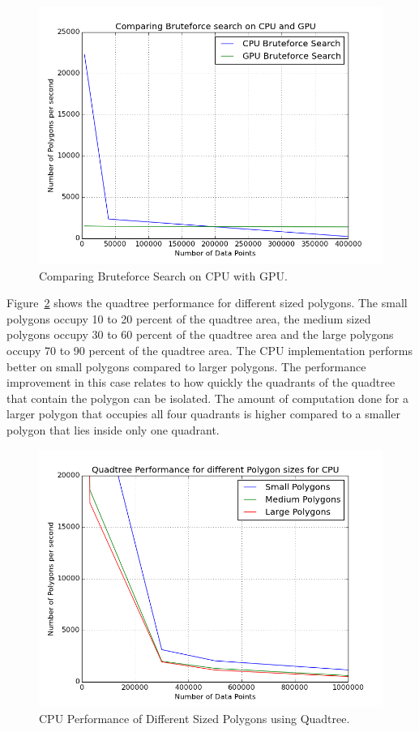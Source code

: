 \begin{figure}[H]
\centering
\vspace{0.5in}
    \includegraphics[scale=0.55]{Images/CPU_GPU_brute_new_2}
    \vspace{0.5in}
    \caption{Comparing Bruteforce Search on CPU with GPU.}
    \label{fig:comparing_bruteforce_gpu}
  \end{figure}

Figure~\ref{fig:cpu_quadtree_performance} shows the quadtree performance for different sized polygons. The small polygons occupy 10 to 20 percent of the quadtree area, the medium sized polygons occupy 30 to 60 percent of the quadtree area and the large polygons occupy 70 to 90 percent of the quadtree area.
The CPU implementation performs better on small polygons compared to larger polygons. The performance improvement in this case relates to how quickly the quadrants of the quadtree that contain the polygon can be isolated. The amount of computation done for a larger polygon that occupies all four quadrants is higher compared to a smaller polygon that lies inside only one quadrant.

\begin{figure}[H]
\centering
\vspace{0.5in}
\includegraphics[scale=0.55]{Images/Different_Sized_Polygon_logScale_cpu04_10}
\vspace{0.5in}
\caption{CPU Performance of Different Sized Polygons using Quadtree.}
\label{fig:cpu_quadtree_performance}
\end{figure}

